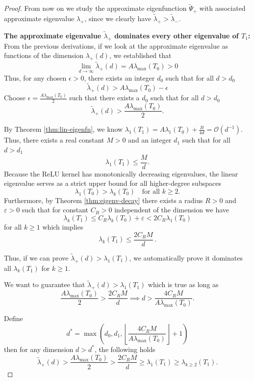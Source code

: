 \begin{proof}
    From now on we study the approximate eigenfunction $\tilde{\Psi}_{+}$ with associated approximate eigenvalue $\lambda_{+}$, since we clearly have $\tilde{\lambda}_{+} > \tilde{\lambda}_{-}$.
    
    {\bf The approximate eigenvalue $\tilde{\lambda}_{+}$ dominates every other eigenvalue of $T_1$:}
    From the previous derivations, if we look at the approximate eigenvalue as functions of the dimension $\lambda_{+}(d)$, we established that 
    \[
        \lim_{d \to \infty} \tilde{\lambda}_{+}(d) = A\lambda_{\max}(T_0) > 0
    \]
    Thus, for any chosen $\epsilon > 0$, there exists an integer $d_0$ such that for all $d > d_0$
    \[
        \tilde{\lambda}_{+}(d) > A\lambda_{\max}(T_0) - \epsilon
    \]
    Choose $\epsilon = \frac{A\lambda_{\max}(T_0)}{2}$ such that there exists a $d_0$ such that for all $d > d_0$
    \[
        \tilde{\lambda}_{+}(d) > \frac{A\lambda_{\max}(T_0)}{2}.
    \]
    
    By Theorem \ref{thm:lin-eigenfn}, we know $\lambda_1(T_1) = A\lambda_1(T_0) + \frac{B}{4d} = \mathcal{O}(d^{-1})$. Thus, there exists a real constant $M > 0$ and an integer $d_1$ such that for all $d > d_1$
    \[
        \lambda_1(T_1) \le \frac{M}{d}.
    \]
    Because the ReLU kernel has monotonically decreasing eigenvalues, the linear eigenvalue serves as a strict upper bound for all higher-degree subspaces
    \[
        \lambda_1(T_0) > \lambda_k(T_0) \quad \text{for all } k \ge 2.
    \]
    Furthermore, by Theorem \ref{thm:eigenv-decay} there exists a radius $R > 0$ and $\varepsilon > 0$ such that for constant $C_R > 0$ independent of the dimension we have
    \[
        \lambda_k(T_1) \leq C_R\lambda_k(T_0) + \varepsilon < 2C_R\lambda_1(T_0)
    \]
    for all $k \geq 1$ which implies
    \[
        \lambda_k (T_1) \leq \frac{2C_RM}{d}\, .
    \]
    
    Thus, if we can prove $\tilde{\lambda}_{+}(d) > \lambda_1(T_1)$, we automatically prove it dominates all $\lambda_k(T_1)$ for $k \ge 1$.
    
    We want to guarantee that $\tilde{\lambda}_{+}(d) > \lambda_1(T_1)$ which is true as long as
    \[
        \frac{A\lambda_{\max}(T_0)}{2} > \frac{2C_RM}{d} \implies d > \frac{4C_RM}{A\lambda_{\max}(T_0)}.
    \]
    
    Define 
    \[
        d^* = \max\left(d_0, d_1, \left\lfloor \frac{4C_RM}{A\lambda_{\max}(T_0)} \right\rfloor + 1 \right)
    \]
    then for any dimension $d > d^*$, the following holds
    \[
        \tilde{\lambda}_{+}(d) > \frac{A\lambda_{\max}(T_0)}{2} > \frac{2C_RM}{d} \ge \lambda_1(T_1) \geq  \lambda_{k \ge 2}(T_1).
    \]


\end{proof}
